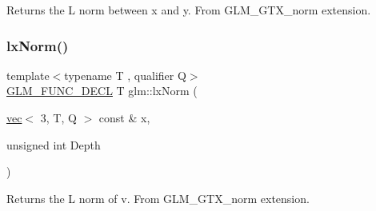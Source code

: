 Returns the L norm between x and y. From G\+L\+M\+\_\+\+G\+T\+X\+\_\+norm extension. \mbox{\label{group__gtx__norm_gac61b6d81d796d6eb4d4183396a19ab91}} 
\subsubsection{\texorpdfstring{lx\+Norm()}{lxNorm()}\hspace{0.1cm}{\footnotesize\ttfamily [2/2]}}
{\footnotesize\ttfamily template$<$typename T , qualifier Q$>$ \\
\mbox{\hyperlink{setup_8hpp_ab2d052de21a70539923e9bcbf6e83a51}{G\+L\+M\+\_\+\+F\+U\+N\+C\+\_\+\+D\+E\+CL}} T glm\+::lx\+Norm (\begin{DoxyParamCaption}\item[{\mbox{\hyperlink{structglm_1_1vec}{vec}}$<$ 3, T, Q $>$ const \&}]{x,  }\item[{unsigned int}]{Depth }\end{DoxyParamCaption})}

Returns the L norm of v. From G\+L\+M\+\_\+\+G\+T\+X\+\_\+norm extension. 
